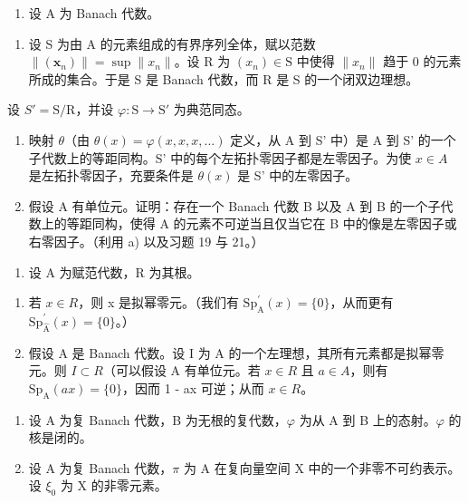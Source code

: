 \begin{enumerate}
\def\labelenumi{¶ \arabic{enumi})}
\setcounter{enumi}{21}
\tightlist
\item
  设 A 为 Banach 代数。
\end{enumerate}

\begin{enumerate}
\def\labelenumi{\alph{enumi})}
\tightlist
\item
  设 S 为由 A 的元素组成的有界序列全体，赋以范数 \(\|(\boldsymbol{x}_{n})\| = \sup \|x_{n}\|\)。设 R 为 \((x_{n}) \in \mathrm{S}\) 中使得 \(\|x_{n}\|\) 趋于 0 的元素所成的集合。于是 S 是 Banach 代数，而 R 是 S 的一个闭双边理想。
\end{enumerate}

设 \(S' = \text{S/R}\)，并设 \(\varphi: \text{S} \to \text{S}'\) 为典范同态。

\begin{enumerate}
\def\labelenumi{\alph{enumi})}
\setcounter{enumi}{1}
\item
  映射 \(\theta\)（由 \(\theta(x) = \varphi(x, x, x, \ldots)\) 定义，从 A 到 S' 中）是 A 到 S' 的一个子代数上的等距同构。S' 中的每个左拓扑零因子都是左零因子。为使 \(x \in A\) 是左拓扑零因子，充要条件是 \(\theta(x)\) 是 S' 中的左零因子。
\item
  假设 A 有单位元。证明：存在一个 Banach 代数 B 以及 A 到 B 的一个子代数上的等距同构，使得 A 的元素不可逆当且仅当它在 B 中的像是左零因子或右零因子。（利用 a) 以及习题 19 与 21。）
\end{enumerate}

\begin{enumerate}
\def\labelenumi{\arabic{enumi})}
\setcounter{enumi}{22}
\tightlist
\item
  设 A 为赋范代数，R 为其根。
\end{enumerate}

\begin{enumerate}
\def\labelenumi{\alph{enumi})}
\item
  若 \(x \in R\)，则 x 是拟幂零元。（我们有 \(\mathrm{Sp}_{\mathrm{A}}^{\prime}(x) = \{0\}\)，从而更有 \(\mathrm{Sp}_{\widehat{\mathrm{A}}}^{\prime}(x) = \{0\}\)。）
\item
  假设 A 是 Banach 代数。设 I 为 A 的一个左理想，其所有元素都是拟幂零元。则 \(I \subset R\)（可以假设 A 有单位元。若 \(x \in R\) 且 \(a \in A\)，则有 \(\mathrm{Sp}_{\mathrm{A}}(ax) = \{0\}\)，因而 1 - ax 可逆；从而 \(x \in R\)。
\end{enumerate}

\begin{enumerate}
\def\labelenumi{\arabic{enumi})}
\setcounter{enumi}{23}
\item
  设 A 为复 Banach 代数，B 为无根的复代数，\(\varphi\) 为从 A 到 B 上的态射。\(\varphi\) 的核是闭的。
\item
  设 A 为复 Banach 代数，\(\pi\) 为 A 在复向量空间 X 中的一个非零不可约表示。设 \(\xi_{0}\) 为 X 的非零元素。
\end{enumerate}


